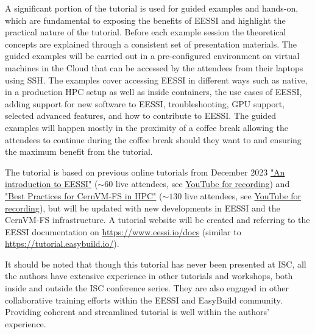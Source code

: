 A significant portion of the tutorial is used for guided examples and hands-on,
which are fundamental to exposing the benefits of EESSI and highlight the practical nature of the tutorial.
Before each example session the theoretical concepts are explained through a consistent set of presentation materials.
The guided examples will be carried out in a pre-configured environment on virtual machines in the Cloud that can be
accessed by the
attendees from their laptops using SSH. 
The examples cover accessing EESSI in different ways such as native, in a production HPC setup as well as inside
containers, the use cases of EESSI, adding support for new software to EESSI, troubleshooting, GPU support, selected
advanced features, and how to contribute to EESSI.
The guided examples will happen mostly in the proximity of a coffee break allowing the attendees to continue
during the coffee break should they want to and ensuring the maximum benefit from the tutorial.

The tutorial is based on previous online tutorials from December 2023
\href{https://raw.githubusercontent.com/eessi/docs/main/talks/20231205-Introduction-to-EESSI-CASTIEL2/20231205-Introduction-to-EESSI-CASTIEL2.pdf}{"An introduction to EESSI"} ($\sim60$ live attendees, see \href{https://www.youtube.com/watch?v=KAYI9oKFLxA}{YouTube for recording}) and
\href{https://raw.githubusercontent.com/multixscale/cvmfs-tutorial-hpc-best-practices/main/files/Best-Practices-for-CernVM-FS-in-HPC-20231204.pdf}{"Best Practices for CernVM-FS in HPC"} ($\sim130$ live attendees, see \href{https://www.youtube.com/watch?v=L0Mmy7NBXDU}{YouTube for recording}),
but will be updated with new developments in EESSI and the CernVM-FS infrastructure.
A tutorial website will be created and referring to the EESSI documentation on
\href{https://www.eessi.io/docs}{https://www.eessi.io/docs} (similar to \href{https://tutorial.easybuild.io/}{https://tutorial.easybuild.io/}).

It should be noted that though this tutorial has never been presented at ISC, all the authors have extensive
experience in other tutorials and workshops, both inside and outside the ISC conference series.
They are also engaged in other collaborative training efforts within the EESSI and EasyBuild community. Providing coherent and streamlined
tutorial is well within the authors' experience.



